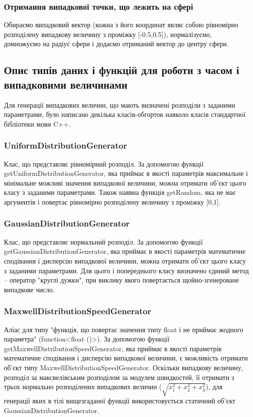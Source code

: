 \documentclass[a4paper,12pt]{article}
\begin{document}
\subsubsection*{Отримання випадкової точки, що лежить на сфері}

Обираємо випадковий вектор (кожна з його координат являє собою рівномірно розподілену випадкову величину з проміжку [-0.5,0.5]), нормалізуємо, домножуємо на радіус сфери і додаємо отриманий вектор до центру сфери.


\subsection{Опис типів даних і функцій для роботи з часом і випадковими величинами}
Для генерації випадкових величин, що мають визначені розподіли з заданими параметрами, було написано декілька класів-обгорток навколо класів стандартної бібліотеки мови C++.

\subsubsection{UniformDistributionGenerator}
Клас, що представляє рівномірний розподіл. За допомогою функції getUniformDistributionGenerator, яка приймає в якості параметрів максимальне і мінімальне можливі значення випадкової величини, можна отримати об’єкт цього класу з заданими параметрами. Також наявна функція getRandom, яка не має аргументів і повертає рівномірно розподілену величину з проміжку [0,1].

\subsubsection{GaussianDistributionGenerator}
Клас, що представляє нормальний розподіл. За допомогою функції getGaussianDistributionGenerator, яка приймає в якості параметрів математичне сподівання і дисперсію випадкової величини, можна отримати об’єкт цього класу з заданими параметрами. Для цього і попереднього класу визначено єдиний метод -- оператор "круглі дужки", при виклику якого повертається щойно-згенероване випадкове число.

\subsubsection{MaxwellDistributionSpeedGenerator}
Аліас для типу "функція, що повертає значення типу float і не приймає жодного параметра" (function<float ()>). За допомогою функції getMaxwellDistributionSpeedGenerator, яка приймає в якості параметрів математичне сподівання і дисперсію випадкової величини, є можливість отримати об’єкт типу MaxwellDistributionSpeedGenerator. Оскільки випадкову величину, розподіл за максвелівським розподілом за модулем швидкостей, її отримати з трьох нормально розподілених випадкових величин ($\sqrt{x_1^2 + x_2^2 + x_3^2}$), для генерації яких в тілі вищезгаданої функції використовується статичний об’єкт GaussianDistributionGenerator.
\end{document}

